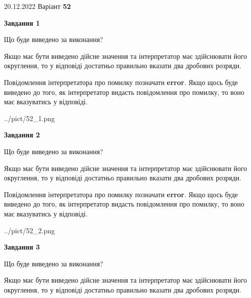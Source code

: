 \documentclass[12pt, ukrainian]{article}
\begin{document}
{20.12.2022 Варіант \No \textbf { 52 }\par}
{
\begin {Large}

{\begin {center}\textbf{Завдання 1}\end {center}}\par
Що буде виведено за виконання? \par

Якщо має бути виведено дійсне значення та інтерпретатор має здійснювати його округлення, 
то у відповіді достатньо правильно вказати два дробових розряди.

Повідомлення інтерпретатора про помилку позначати \textbf{error}.
Якщо щось буде виведено до того, як інтерпретатор видасть повідомлення про помилку, 
то воно має вказуватись у відповіді. \par

\begin{center}
	{../pict/52_1.png}
\end{center}
\newpage

{\begin {center}\textbf{Завдання 2}\end {center}}\par
Що буде виведено за виконання? \par

Якщо має бути виведено дійсне значення та інтерпретатор має здійснювати його округлення, 
то у відповіді достатньо правильно вказати два дробових розряди.

Повідомлення інтерпретатора про помилку позначати \textbf{error}.
Якщо щось буде виведено до того, як інтерпретатор видасть повідомлення про помилку, 
то воно має вказуватись у відповіді. \par

\begin{center}
	{../pict/52_2.png}
\end{center}
\newpage

{\begin {center}\textbf{Завдання 3}\end {center}}\par
Що буде виведено за виконання? \par

Якщо має бути виведено дійсне значення та інтерпретатор має здійснювати його округлення, 
то у відповіді достатньо правильно вказати два дробових розряди.


\end{Large}}
\end{document}
